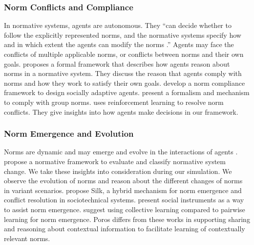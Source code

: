 \documentclass[11pt,          %
               phd,           %
               onehalfspacing %
               ]{ncsuthesis}
\newcommand{\frameworkB}{Poros\xspace}
\begin{document}
\subsubsection{Norm Conflicts and Compliance}
In normative systems, agents are autonomous. They ``can decide whether
to follow the explicitly represented norms, and the normative systems
specify how and in which extent the agents can modify the norms
\citep{Boella2006NormativeSystems}.'' Agents may face the conflicts of
multiple applicable norms, or conflicts between norms and their own
goals. \citet{Lopez2006NormativeFramework} proposes a formal
framework that describes how agents reason about norms in a normative
system. They discuss the reason that agents comply with norms and how
they work to satisfy their own goals. 
 develop a norm compliance
framework to design socially adaptive agents. 
\citet{Aldewereld-TAAS16-GroupNorms} present a formalism and mechanism to
comply with group norms. \citet{Sugawara-IJCAI11-Emergence} uses
reinforcement learning to resolve norm conflicts. They give insights
into how agents make decisions in our framework.

\subsubsection{Norm Emergence and Evolution}
Norms are dynamic and may emerge and
evolve in the interactions of agents
\citep{Savarimuthu2009NormEmergence}. \citet{Boella2009Change} propose a normative framework to evaluate and
classify normative system change. We take these insights into
consideration during our simulation. We observe the evolution of norms
and reason about the different changes of norms in variant scenarios.
\citet{Mashayekhi-IJCAI16-Silk} propose Silk, a hybrid
mechanism for norm emergence and conflict resolution in sociotechnical
systems. \citet{Villatoro-TAAS13-Robust} present social
instruments as a way to assist norm emergence. 
\citet{Yu-AAMAS13-Emergence} suggest using collective learning compared
to pairwise learning for norm emergence. \frameworkB differs from these
works in supporting sharing and reasoning about contextual information
to facilitate learning of contextually relevant norms.
\end{document}
